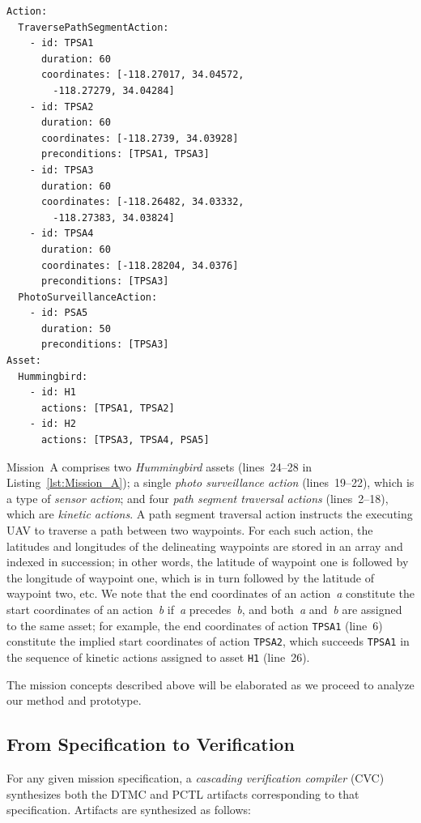 \begin{lstlisting}[caption={YAML code for Mission~A},label=lst:Mission_A]
Action:
  TraversePathSegmentAction:
    - id: TPSA1
      duration: 60
      coordinates: [-118.27017, 34.04572,
        -118.27279, 34.04284]
    - id: TPSA2
      duration: 60
      coordinates: [-118.2739, 34.03928]
      preconditions: [TPSA1, TPSA3]
    - id: TPSA3
      duration: 60
      coordinates: [-118.26482, 34.03332,
        -118.27383, 34.03824]
    - id: TPSA4
      duration: 60
      coordinates: [-118.28204, 34.0376]
      preconditions: [TPSA3]
  PhotoSurveillanceAction:
    - id: PSA5
      duration: 50
      preconditions: [TPSA3]
Asset:
  Hummingbird:
    - id: H1
      actions: [TPSA1, TPSA2]
    - id: H2
      actions: [TPSA3, TPSA4, PSA5]
\end{lstlisting}

Mission~A comprises two \emph{Hummingbird} assets (lines~24--28 in Listing~\ref{lst:Mission_A}); a single \emph{photo surveillance action} (lines~19--22), which is a type of \emph{sensor action}; and four \emph{path segment traversal actions} (lines~2--18), which are \emph{kinetic actions}. A path segment traversal action instructs the executing UAV to traverse a path between two waypoints. For each such action, the latitudes and longitudes of the delineating waypoints are stored in an array and indexed in succession; in other words, the latitude of waypoint one is followed by the longitude of waypoint one, which is in turn followed by the latitude of waypoint two, etc. We note that the end coordinates of an action~\emph{a} constitute the start coordinates of an action~\emph{b} if~\emph{a} precedes~\emph{b}, and both~\emph{a} and~\emph{b} are assigned to the same asset; for example, the end coordinates of action \texttt{TPSA1} (line~6) constitute the implied start coordinates of action \texttt{TPSA2}, which succeeds \texttt{TPSA1} in the sequence of kinetic actions assigned to asset \texttt{H1} (line~26).

The mission concepts described above will be elaborated as we proceed to analyze our method and prototype.

\subsection{From Specification to Verification}

\noindent For any given mission specification, a \emph{cascading verification compiler} (CVC) synthesizes both the DTMC and PCTL artifacts corresponding to that specification. Artifacts are synthesized as follows:

